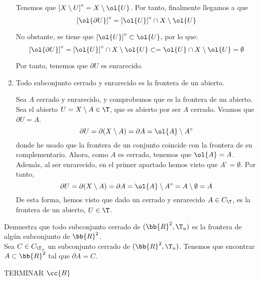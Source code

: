 \begin{ejercicio}
\begin{enumerate}
        Tenemos que $\left[X\setminus U\right]^\circ=X\setminus \ol{U}$. Por tanto, finalmente llegamos a que 
        $$\left[\ol{\partial U}\right]^\circ
            = \left[\ol{U}\right]^\circ\cap X\setminus\ol{U}
        $$

        No obstante, se tiene que $\left[\ol{U}\right]^\circ\subset \ol{U}$, por lo que:
        $$\left[\ol{\partial U}\right]^\circ
            = \left[\ol{U}\right]^\circ\cap X\setminus\ol{U}
            \subset 
            = \ol{U} \cap X\setminus\ol{U} = \emptyset
        $$

        Por tanto, tenemos que $\partial U$ es enrarecido.
        
        \item Todo subconjunto cerrado y enrarecido es la frontera de un abierto.

        Sea $A$ cerrado y enrarecido, y comprobemos que es la frontera de un abierto. Sea el abierto $U=X\setminus A\in \T$, que es abierto por ser $A$ cerrado. Veamos que $\partial U=A$.
        \begin{equation*}
            \partial U = \partial (X\setminus A) = \partial A = \ol{A}\setminus A^\circ
        \end{equation*}
        donde he usado que la frontera de un conjunto coincide con la frontera de su complementario. Ahora, como $A$ es cerrado, tenemos que $\ol{A}=A$. Además, al ser enrarecido, en el primer apartado hemos visto que $A^\circ = \emptyset$. Por tanto, 
        \begin{equation*}
            \partial U = \partial (X\setminus A) = \partial A = \ol{A}\setminus A^\circ = A\setminus \emptyset = A
        \end{equation*}
        De esta forma, hemos visto que dado un cerrado y enrarecido $A\in C_\T$, es la frontera de un abierto, $U\in \T$.
    \end{enumerate}
\end{ejercicio}

\begin{ejercicio}
    Demuestra que todo subconjunto cerrado de $(\bb{R}^2, \T_u)$ es la frontera de algún subconjunto de $\bb{R}^2$.\\

    Sea $C\in C_{\T_u}$ un subconjunto cerrado de $(\bb{R}^2, \T_u)$. Tenemos que encontrar $A\subset  \bb{R}^2$ tal que $\partial A=C$.

    TERMINAR $\cc{B}$
\end{ejercicio}

